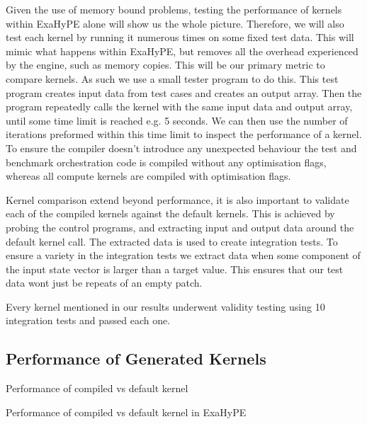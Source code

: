 Given the use of memory bound problems, testing the performance of kernels within ExaHyPE alone will show us the whole picture.
Therefore, we will also test each kernel by running it numerous times on some fixed test data.
This will mimic what happens within ExaHyPE, but removes all the overhead experienced by the engine, such as memory copies.
This will be our primary metric to compare kernels.
As such we use a small tester program to do this.
This test program creates input data from test cases and creates an output array.
Then the program repeatedly calls the kernel with the same input data and output array, until some time limit is reached e.g. 5 seconds.
We can then use the number of iterations preformed within this time limit to inspect the performance of a kernel.
To ensure the compiler doesn't introduce any unexpected behaviour the test and benchmark orchestration code is compiled without any optimisation flags, whereas all compute kernels are compiled with optimisation flags.

Kernel comparison extend beyond performance, it is also important to validate each of the compiled kernels against the default kernels.
This is achieved by probing the control programs, and extracting input and output data around the default kernel call.
The extracted data is used to create integration tests.
To ensure a variety in the integration tests we extract data when some component of the input state vector is larger than a target value. 
This ensures that our test data wont just be repeats of an empty patch.

Every kernel mentioned in our results underwent validity testing using 10 integration tests and passed each one.

\subsection{Performance of Generated Kernels}

\begin{table}
    \centering
 
\caption{Performance of compiled vs default kernel}\label{tab:kernel_comapre} 
\end{table}


\begin{table}
    \centering
 
\caption{Performance of compiled vs default kernel in ExaHyPE}\label{tab:exahype} 
\end{table}

